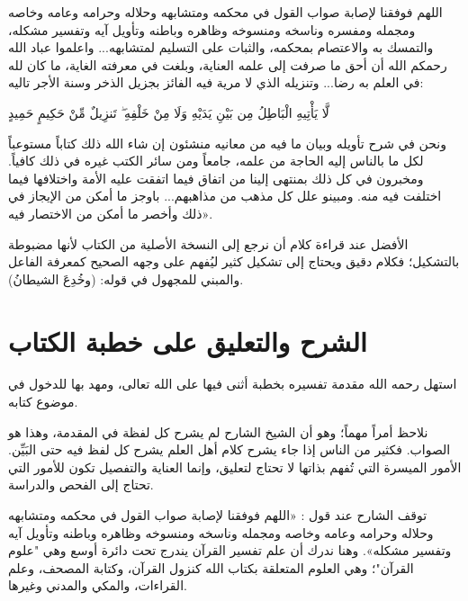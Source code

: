 اللهم فوفقنا لإصابة صواب القول في محكمه ومتشابهه وحلاله وحرامه وعامه وخاصه ومجمله ومفسره وناسخه ومنسوخه وظاهره وباطنه وتأويل آيه وتفسير مشكله، والتمسك به والاعتصام بمحكمه، والثبات على التسليم لمتشابهه... واعلموا عباد الله رحمكم الله أن أحق ما صرفت إلى علمه العناية، وبلغت في معرفته الغاية، ما كان لله في العلم به رضا... وتنزيله الذي لا مرية فيه الفائز بجزيل الذخر وسنة الأجر تاليه:
\begin{ayah}
لَّا يَأْتِيهِ الْبَاطِلُ مِن بَيْنِ يَدَيْهِ وَلَا مِنْ خَلْفِهِ ۖ تَنزِيلٌ مِّنْ حَكِيمٍ حَمِيدٍ
\end{ayah}

ونحن في شرح تأويله وبيان ما فيه من معانيه منشئون إن شاء الله ذلك كتاباً مستوعباً لكل ما بالناس إليه الحاجة من علمه، جامعاً ومن سائر الكتب غيره في ذلك كافياً. ومخبرون في كل ذلك بمنتهى إلينا من اتفاق فيما اتفقت عليه الأمة واختلافها فيما اختلفت فيه منه. ومبينو علل كل مذهب من مذاهبهم... باوجز ما أمكن من الإيجاز في ذلك وأخصر ما أمكن من الاختصار فيه».

\begin{fawaid}
الأفضل عند قراءة كلام  أن نرجع إلى النسخة الأصلية من الكتاب لأنها مضبوطة بالتشكيل؛ فكلام  دقيق ويحتاج إلى تشكيل كثير ليُفهم على وجهه الصحيح كمعرفة الفاعل والمبني للمجهول في قوله: (وخُدِعَ الشيطانُ).
\end{fawaid}

\separator

\section{الشرح والتعليق على خطبة الكتاب}
استهل  رحمه الله مقدمة تفسيره بخطبة أثنى فيها على الله تعالى، ومهد بها للدخول في موضوع كتابه.

\begin{fawaid}
نلاحظ أمراً مهماً؛ وهو أن الشيخ الشارح لم يشرح كل لفظة في المقدمة، وهذا هو الصواب. فكثير من الناس إذا جاء يشرح كلام أهل العلم يشرح كل لفظ فيه حتى البَيِّن. الأمور الميسرة التي تُفهم بذاتها لا تحتاج لتعليق، وإنما العناية والتفصيل تكون للأمور التي تحتاج إلى الفحص والدراسة.
\end{fawaid}

توقف الشارح عند قول : «اللهم فوفقنا لإصابة صواب القول في محكمه ومتشابهه وحلاله وحرامه وعامه وخاصه ومجمله وناسخه ومنسوخه وظاهره وباطنه وتأويل آيه وتفسير مشكله».
وهنا ندرك أن علم تفسير القرآن يندرج تحت دائرة أوسع وهي "علوم القرآن"؛ وهي العلوم المتعلقة بكتاب الله كنزول القرآن، وكتابة المصحف، وعلم القراءات، والمكي والمدني وغيرها.


